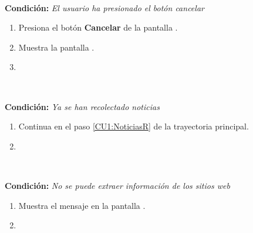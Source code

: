 \begin{large}
	\\
\end{large}	
\textbf{Condición:} \textit{El usuario ha presionado el botón cancelar}

\begin{enumerate}[{B-}1.]

	\item \actor Presiona el botón \textbf{Cancelar} de la pantalla .

	\item \sistema Muestra la pantalla .

	\item \finCU

\end{enumerate}


\begin{large}
	\\
\end{large}	
\textbf{Condición:} \textit{Ya se han recolectado noticias}

\begin{enumerate}[{C-}1.]

	\item \actor Continua en el paso \ref{CU1:NoticiasR} de la trayectoria principal.

	\item \finTA

\end{enumerate}

\begin{large}
	\\
\end{large}	
\textbf{Condición:} \textit{No se puede extraer información de los sitios web }

\begin{enumerate}[{D-}1.]

	\item \sistema Muestra el mensaje  en la pantalla .

	\item \finCU

\end{enumerate}



